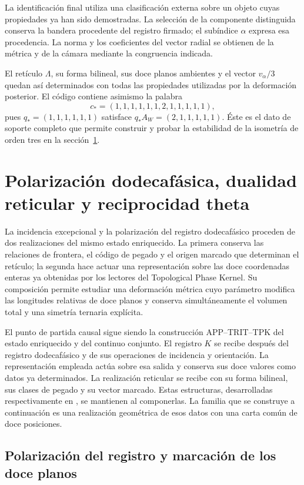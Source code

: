 \documentclass[a4paper,10pt]{article}
\theoremstyle{definition}\newtheorem{definition}[theorem]{Definición}
\theoremstyle{remark}\newtheorem{remark}[theorem]{Observación}
\numberwithin{equation}{section}
\begin{document}
La identificación final utiliza una clasificación
externa sobre un objeto cuyas propiedades ya han
sido demostradas. La selección de la componente
distinguida conserva la bandera procedente del
registro firmado; el subíndice \(\alpha\) expresa
esa procedencia. La norma y los coeficientes del
vector radial se obtienen de la métrica y de
la cámara mediante la congruencia indicada.

El retículo \(\Lambda\), su forma bilineal, sus
doce planos ambientes y el vector \(v_\alpha/3\)
quedan así determinados con todas las propiedades
utilizadas por la deformación posterior. El
código contiene asimismo la palabra
\[
 c_*=(1,1,1,1,1,1,2,1,1,1,1,1),
\]
pues \(q_*=(1,1,1,1,1,1)\) satisface
\(q_*A_W=(2,1,1,1,1,1)\). Éste es el dato
de soporte completo que permite construir y
probar la estabilidad de la isometría de orden
tres en la sección~\ref{sec:leech-dualidad}.

\section{Polarización dodecafásica, dualidad reticular y reciprocidad theta}
\label{sec:leech-dualidad}

La incidencia excepcional y la polarización del registro dodecafásico
proceden de dos realizaciones del mismo estado enriquecido. La primera
conserva las relaciones de frontera, el código de pegado y el origen
marcado que determinan el retículo; la segunda hace actuar una
representación sobre las doce coordenadas enteras ya obtenidas por los
lectores del Topological Phase Kernel. Su composición permite estudiar
una deformación métrica cuyo parámetro modifica las longitudes relativas
de doce planos y conserva simultáneamente el volumen total y una
simetría ternaria explícita.

El punto de partida causal sigue siendo la construcción
APP--TRIT--TPK del estado enriquecido y del continuo conjunto.
El registro \(K\) se recibe después del registro dodecafásico y de sus
operaciones de incidencia y orientación. La representación empleada
actúa sobre esa salida y conserva sus doce valores como datos ya
determinados. La realización reticular se recibe con su forma bilineal,
sus clases de pegado y su vector marcado. Estas estructuras, desarrolladas
respectivamente en \cite{hmtX,HMT-IV}, se mantienen al componerlas.
La familia que se construye a continuación es una realización geométrica
de esos datos con una carta común de doce posiciones.

\subsection{Polarización del registro y marcación de los doce planos}
\label{subsec:leech-polarizacion}
\end{document}
